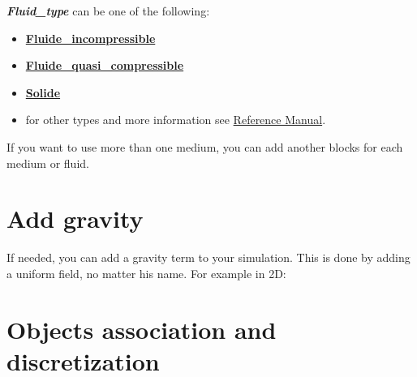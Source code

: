 {\bf{\textit{Fluid\_type}}} can be one of the following:
\begin{itemize}
\item \href{\REFERENCEMANUAL\#fluideincompressible}{\textbf{Fluide\_incompressible}}
\item \href{\REFERENCEMANUAL\#fluidequasicompressible}{\textbf{Fluide\_quasi\_compressible}}
\item \href{\REFERENCEMANUAL\#solide}{\textbf{Solide}}
\item for other types and more information see \href{\REFERENCEMANUAL\#milieubase}{\trustref Reference Manual}.
\end{itemize}

If you want to use more than one medium, you can add another blocks for each medium or fluid.\\





\section{Add gravity}
If needed, you can add a gravity term to your simulation. This is done by adding
a uniform field, no matter his name. For example in 2D:

    \begin{center}
    \end{center}




\section{Objects association and discretization}
